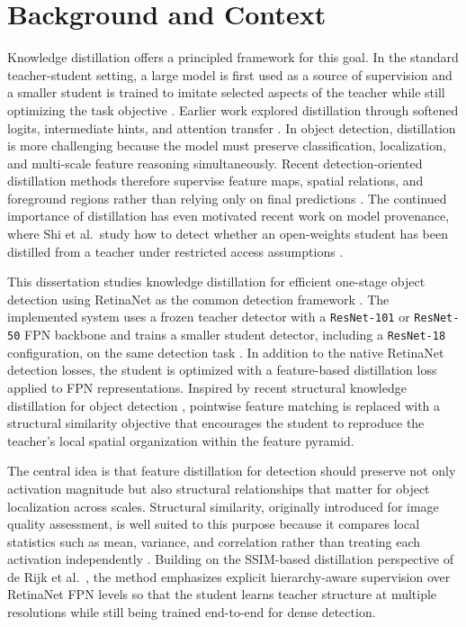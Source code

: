 \section{Background and Context}

Knowledge distillation offers a principled framework for this goal. In the standard teacher-student setting, a large model is first used as a source of supervision and a smaller student is trained to imitate selected aspects of the teacher while still optimizing the task objective \cite{hinton2015distilling}. Earlier work explored distillation through softened logits, intermediate hints, and attention transfer \cite{romero2015fitnets,zagoruyko2017paying}. In object detection, distillation is more challenging because the model must preserve classification, localization, and multi-scale feature reasoning simultaneously. Recent detection-oriented distillation methods therefore supervise feature maps, spatial relations, and foreground regions rather than relying only on final predictions \cite{wang2019distilling,dai2021gid,guo2021defeat,kang2021icd,du2021frs,li2022rank,yang2022focal}. The continued importance of distillation has even motivated recent work on model provenance, where Shi et al.\ study how to detect whether an open-weights student has been distilled from a teacher under restricted access assumptions \cite{shi2025kddetection}.

This dissertation studies knowledge distillation for efficient one-stage object detection using RetinaNet as the common detection framework \cite{hinton2015distilling,lin2017focal}. The implemented system uses a frozen teacher detector with a \texttt{ResNet-101} or \texttt{ResNet-50} FPN backbone and trains a smaller student detector, including a \texttt{ResNet-18} configuration, on the same detection task \cite{he2016resnet,lin2017fpn}. In addition to the native RetinaNet detection losses, the student is optimized with a feature-based distillation loss applied to FPN representations. Inspired by recent structural knowledge distillation for object detection \cite{derijk2022structural}, pointwise feature matching is replaced with a structural similarity objective that encourages the student to reproduce the teacher's local spatial organization within the feature pyramid.

The central idea is that feature distillation for detection should preserve not only activation magnitude but also structural relationships that matter for object localization across scales. Structural similarity, originally introduced for image quality assessment, is well suited to this purpose because it compares local statistics such as mean, variance, and correlation rather than treating each activation independently \cite{wang2004ssim}. Building on the SSIM-based distillation perspective of de Rijk et al.\ \cite{derijk2022structural}, the method emphasizes explicit hierarchy-aware supervision over RetinaNet FPN levels so that the student learns teacher structure at multiple resolutions while still being trained end-to-end for dense detection.

